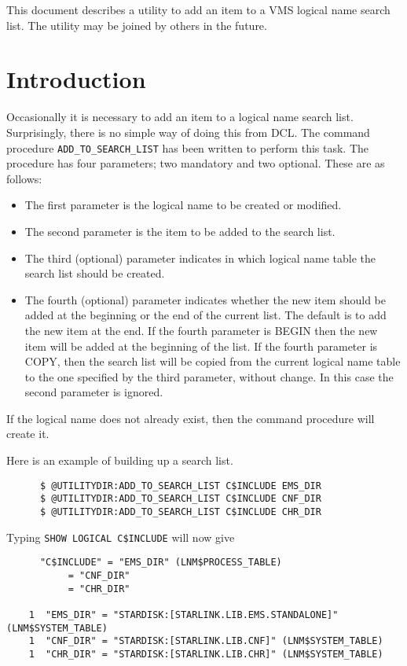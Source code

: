 This document describes a utility to add an item to a VMS logical name search
list. The utility may be joined by others in the future.

\section{Introduction}

Occasionally it is necessary to add an item to a logical name search list.
Surprisingly, there is no simple way of doing this from DCL. The command
procedure {\tt ADD\_TO\_SEARCH\_LIST} has been written to perform this task.
The procedure has four parameters; two mandatory and two optional. These are as
follows:

\begin{itemize}
\item The first parameter is the logical name to be created or modified. 
\item The second parameter is the item to be added to the search list. 
\item The third (optional) parameter indicates in which logical name table the
search list should be created.
\item The fourth (optional) parameter indicates whether the new item should be
added at the beginning or the end of the current list. The default is to add
the new item at the end. If the fourth parameter is BEGIN then the new item
will be added at the beginning of the list. If the fourth parameter is COPY,
then the search list will be copied from the current logical name table to the
one specified by the third parameter, without change. In this case the second
parameter is ignored.
\end{itemize}

If the logical name does not already exist, then the command procedure will
create it.

Here is an example of building up a search list.

\begin{verbatim}
      $ @UTILITYDIR:ADD_TO_SEARCH_LIST C$INCLUDE EMS_DIR
      $ @UTILITYDIR:ADD_TO_SEARCH_LIST C$INCLUDE CNF_DIR
      $ @UTILITYDIR:ADD_TO_SEARCH_LIST C$INCLUDE CHR_DIR
\end{verbatim}

Typing {\tt SHOW LOGICAL C\$INCLUDE}  will now give 

\begin{verbatim}
      "C$INCLUDE" = "EMS_DIR" (LNM$PROCESS_TABLE)
           = "CNF_DIR"
           = "CHR_DIR"

    1  "EMS_DIR" = "STARDISK:[STARLINK.LIB.EMS.STANDALONE]" (LNM$SYSTEM_TABLE)
    1  "CNF_DIR" = "STARDISK:[STARLINK.LIB.CNF]" (LNM$SYSTEM_TABLE)
    1  "CHR_DIR" = "STARDISK:[STARLINK.LIB.CHR]" (LNM$SYSTEM_TABLE)
\end{verbatim}

